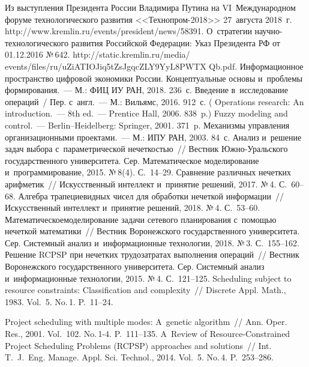 \begin{multicols}{2}
{{\begin{thebibliography}{99}
Из выступления Президента России Владимира Путина  
на VI~Международном форуме технологического развития <<Технопром-2018>> 
27~августа 2018~г. {\sf http://www.kremlin.ru/events/president/news/58391}.
О~стратегии на\-уч\-но-тех\-но\-ло\-ги\-че\-ско\-го развития Российской Федерации: Указ 
Президента РФ от 01.12.2016 №\,642. {\sf 
http://static.kremlin.ru/media/ events/files/ru/uZiATIOJiq5tZsJgqcZLY9YyL8PWTX Qb.pdf}.
 Информационное 
пространство цифровой экономики России. Концептуальные основы и~проб\-ле\-мы 
формирования.~--- М.: ФИЦ ИУ РАН, 2018. 236~с.
 Введение в~исследование операций~/ Пер. с~англ.~--- М.: Вильямс, 2016. 
912~с. ( Operations research: An introduction.~--- 8th ed.~--- Prentice Hall, 
2006. 838~p.)
 Fuzzy modeling and control.~--- Berlin--Heidelberg: Springer, 2001. 371~p.
 Механизмы управления 
организационными проектами.~--- М.: ИПУ РАН, 2003. 84~с.
 Анализ и~решение задач выбора с~параметрической нечеткостью~// 
Вестник Юж\-но-Ураль\-ско\-го государственного университета. Сер. Математическое 
моделирование и~программирование, 2015. №\,8(4). С.~14--29.
 Сравнение различных нечетких арифметик~// 
Искусственный интеллект и~принятие решений, 2017. №\,4. С.~60--68.
 Алгебра трапециевидных чисел для обработки 
нечеткой информации~// Искусственный интеллект и~принятие решений, 2018. №\,4.  
С.~53--60.
 Математическое\linebreak моделирование задачи сетевого 
планирования с~по\-мощью нечеткой математики~// Вестник 
Воронежского государственного университета. Сер. Системный анализ 
и~информационные технологии, 2018. №\,3. С.~155--162.
 Решение RCPSP при нечетких трудозатратах 
выполнения операций~// Вестник Воронежского государственного университета. 
Сер. Системный анализ и~информационные 
технологии, 2015. №\,4. С.~121--125.
 Scheduling subject to resource 
constraints: Classification and complexity~// Discrete Appl. Math., 1983. Vol.~5. No.\,1. 
P.~11--24.

 Project scheduling with multiple modes: A~genetic algorithm~// Ann. 
Oper. Res., 2001. Vol.~102. No.\,1-4. P.~111--135.
 A~Review of Resource-Constrained Project Scheduling Problems (RCPSP) 
approaches and solutions~// Int. T.~J.~Eng. Manage. Appl. Sci. 
Technol., 2014. Vol.~5. No.\,4. P.~253--286.


\end{thebibliography}}}
\end{multicols}
